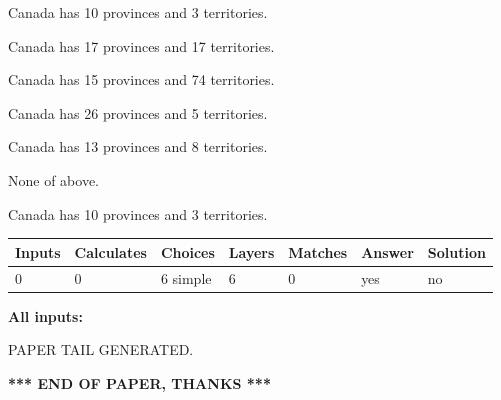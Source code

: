 \documentclass[12pt]{article}
\begin{document}
 
Canada has 10  provinces and 3 territories.
 
 
Canada has  17 provinces and  17 territories.
 
 
Canada has  15 provinces and  74 territories.
 
 
Canada has  26 provinces and  5 territories.
 
 
Canada has  13 provinces and  8 territories.
 
 
 None of above.
 
 
\noindent{}
 
 
Canada has 10  provinces and 3 territories.
 
 
\noindent{}
 
 
   
   
   
   
\noindent\begin{tabular}{|l|l|l|l|l|l|l|}
 \hline
Inputs & Calculates & Choices & Layers & Matches & Answer & Solution \\ \hline
 0  & 
 0  & 
 6
  simple  
  & 
 6  & 
 0  & 
  yes & 
  no 
  \\ \hline
 \end{tabular}
   
   
   
   
\noindent{}
   
   
   
   
\noindent\vspace{0.1in}\hspace{-0.08in} {\textbf{\Large{All inputs: }}}
   
   
   
   
   
   
 \vspace{0.2in}
 
   
   
\vspace{2.0in} PAPER TAIL GENERATED.
   
   
   
   
\vspace{1.0in} 
{\textbf{\large{ *** END OF PAPER, THANKS *** }}} 
   
\end{document}
